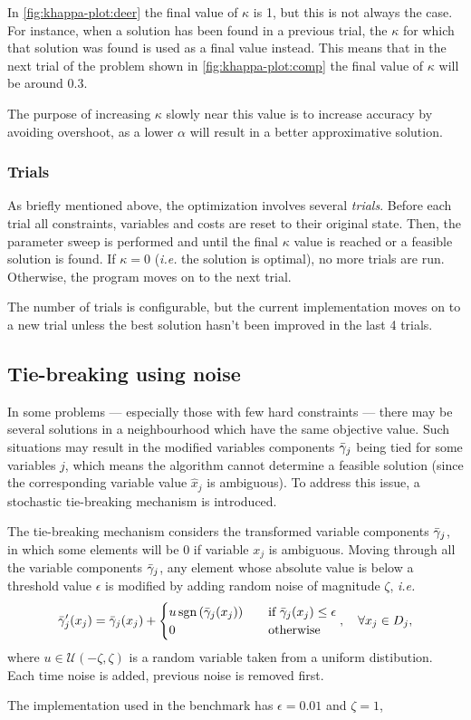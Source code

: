 In \cref{fig:khappa-plot:deer} the final value of \(\kappa\) is 1, but this is not always the case.
For instance, when a solution has been found in a previous trial, the \(\kappa\) for which that solution was found is used as a final value instead.
This means that in the next trial of the problem shown in \cref{fig:khappa-plot:comp} the final value of \(\kappa\) will be around \num{0.3}.

The purpose of increasing \(\kappa\) slowly near this value is to increase accuracy by avoiding overshoot, as a lower \(\alpha\) will result in a better approximative solution.

\subsubsection{Trials}
As briefly mentioned above, the optimization involves several \emph{trials}.
Before each trial all constraints, variables and costs are reset to their original state.
Then, the parameter sweep is performed and until the final \(\kappa\) value is reached or a feasible solution is found.
If \(\kappa=0\) (\emph{i.e.} the solution is optimal), no more trials are run.
Otherwise, the program moves on to the next trial.

The number of trials is configurable, but the current implementation moves on to a new trial unless the best solution hasn't been improved in the last 4 trials.

\subsection{Tie-breaking using noise}
In some problems --- especially those with few hard constraints --- there may be several solutions in a neighbourhood which have the same objective value.
Such situations may result in the modified variables components \(\bar{\gamma}_j\) being tied for some variables \(j\), which means the algorithm cannot determine a feasible solution (since the corresponding variable value \(\hat{x}_j\) is ambiguous).
To address this issue, a stochastic tie-breaking mechanism is introduced.

The tie-breaking mechanism considers the transformed variable components \(\bar{\gamma}_j\), in which some elements will be \(0\) if variable \(x_j\) is ambiguous.
Moving through all the variable components \(\bar{\gamma}_j\), any element whose absolute value is below a threshold value \(\epsilon\) is modified by adding random noise of magnitude \(\zeta\), \emph{i.e.}
\begin{equation*}
	\bar{\gamma}'_j(x_j) = \bar{\gamma}_j(x_j) + \begin{cases}
		u \operatorname{\mathrm{sgn}}\left(\bar{\gamma}_j(x_j)\right) \quad & \text{if \(\bar{\ensuremath{\gamma}}_j(x_j) \leq \epsilon\)} \\
		0 & \text{otherwise}
	\end{cases}, \quad \forall x_j \in D_j,
\end{equation*}
where \(u \in \mathcal{U}(-\zeta,\zeta)\) is a random variable taken from a uniform distibution.
Each time noise is added, previous noise is removed first.

The implementation used in the benchmark has \(\epsilon=\num{0.01}\) and \(\zeta=1\),
